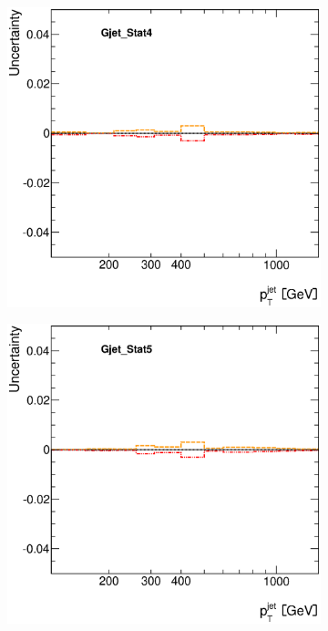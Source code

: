 \documentclass[12pt, twoside]{article}
\numberwithin{equation}{section}
\numberwithin{figure}{section}
\newenvironment{changemargin}[2]{%
\begin{list}{}{%
\setlength{\topsep}{0pt}%
\setlength{\leftmargin}{#1}%
\setlength{\rightmargin}{#2}%
\setlength{\listparindent}{\parindent}%
\setlength{\itemindent}{\parindent}%
\setlength{\parsep}{\parskip}%
}%
\item[]}{\end{list}}
\begin{document}
\begin{figure}[H]
\begin{changemargin}{-1.0cm}{-0.75cm}
\begin{changemargin}{-0.75cm}{-1.0cm}
        \begin{subfigure}[b]{0.25\textwidth}
            \includegraphics[width=\textwidth]{./images/JetSystematics/JetSystematic-13.eps}
        \end{subfigure}
        \begin{subfigure}[b]{0.25\textwidth}
            \includegraphics[width=\textwidth]{./images/JetSystematics/JetSystematic-14.eps}

\end{subfigure}
\end{changemargin}
\end{changemargin}
\end{figure}
\end{document}
